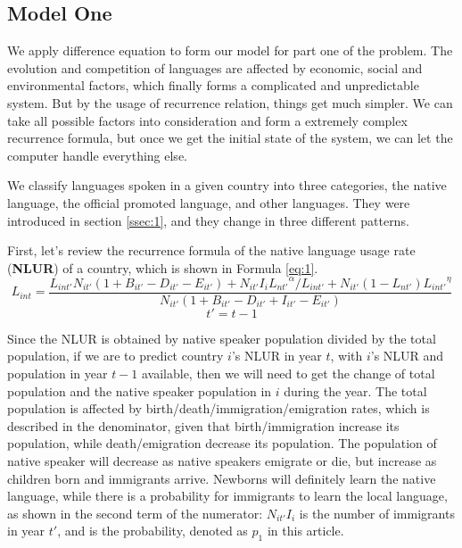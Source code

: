 \documentclass{mcmthesis}
\begin{document}
\subsection{Model One}
We apply difference equation to form our model for part one of the problem. The evolution and competition of languages are affected by economic, social and environmental factors, which finally forms a complicated and unpredictable system. But by the usage of recurrence relation, things get much simpler. We can take all possible factors into consideration and form a extremely complex recurrence formula, but once we get the initial state of the system, we can let the computer handle everything else.

We classify languages spoken in a given country into three categories, the native language, the official promoted language, and other languages. They were introduced in section \ref{ssec:1}, and they change in three different patterns.

First, let's review the recurrence formula of the native language usage rate (\textbf{NLUR}) of a country, which is shown in Formula \ref{eq:1}.
\begin{equation} \label{eq:1}
    L_{int} = \frac{L_{int'}N_{it'}(1+B_{it'}-D_{it'}-E_{it'})+N_{it'}I_i{L_{nt'}}^\alpha/L_{int'}+N_{it'}(1-L_{nt'}){L_{int'}}^\eta}{N_{it'}(1+B_{it'}-D_{it'}+I_{it'}-E_{it'})}
\end{equation}
\begin{equation*}
    t'=t-1
\end{equation*}


Since the NLUR is obtained by native speaker population divided by the total population, if we are to predict country $i$'s NLUR in year $t$, with $i$'s NLUR and population in year $t-1$ available, then we will need to get the change of total population and the native speaker population in $i$ during the year. The total population is affected by birth/death/immigration/emigration rates, which is described in the denominator, given that birth/immigration increase its population, while death/emigration decrease its population. The population of native speaker will decrease as native speakers emigrate or die, but increase as children born and immigrants arrive. Newborns will definitely learn the native language, while there is a probability for immigrants to learn the local language, as shown in the second term of the numerator: $N_{it'}I_i$ is the number of immigrants in year $t'$, and  is the probability, denoted as $p_1$ in this article.
\end{document}
